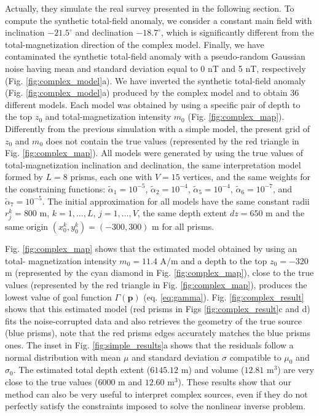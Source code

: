Actually, they simulate the real survey presented in the following section. To compute the synthetic total-field anomaly, we consider a constant main field with inclination $ -21.5^\circ $ and declination $ -18.7^\circ $, which is significantly different from the total-magnetization direction of the complex model. Finally, we have
contaminated the synthetic total-field anomaly with a pseudo-random Gaussian noise having mean and standard deviation equal to 0 nT and 5 nT, respectively (Fig. \ref{fig:complex_model}a). We have inverted the synthetic total-field anomaly (Fig. \ref{fig:complex_model}a) produced by the complex model and to obtain 36 different models. Each model was obtained by using a specific pair of depth to the top $ z_0 $
and total-magnetization intensity $ m_0 $ (Fig. \ref{fig:complex_map}). Differently from the previous simulation with a simple model, the present grid of $ z_0 $ and $ m_0 $ does not contain the true values (represented by the red triangle in Fig. \ref{fig:complex_map}). All models were generated by using the true values of total-magnetization inclination and declination, the same interpretation model formed by $ L = 8 $ prisms, each one with $ V = 15 $ vertices, and the same weights for the constraining functions: $\tilde{\alpha}_1 = 10^{-5}$, $\tilde{\alpha}_2 = 10^{-4}$, $\tilde{\alpha}_5 = 10^{-4}$, $\tilde{\alpha}_6 = 10^{-7}$, and $\tilde{\alpha}_7 = 10^{-5}$. The initial approximation for all models have the same constant radii $ r^k_j = 800 $ m, $ k = 1, \dots, L $, $ j = 1, \dots, V $, the same depth extent $ dz = 650 $ m and the same origin $ (x^k_0, y^k_0) = (-300, 300) $ m for all prisms.

Fig. \ref{fig:complex_map} shows that the estimated model obtained by using an total- magnetization intensity $ m_0 = 11.4 $ A/m and a depth to the top $ z_0 = -320 $ m (represented by the cyan diamond in Fig. \ref{fig:complex_map}), close to the true values (represented by the red triangle in Fig. \ref{fig:complex_map}), produces the lowest value of goal function $ \Gamma(\mathbf{p}) $ (eq. \ref{eq:gamma}). Fig. \ref{fig:complex_result} shows that this estimated model (red prisms in Figs \ref{fig:complex_result}c and d) fits the noise-corrupted data and also retrieves the geometry of the true source (blue prisms), note that the red prisms edges accurately matches the blue prisms ones. The inset in Fig. \ref{fig:simple_results}a shows that the residuals follow a normal distribution with mean $ \mu $ and standard deviation $ \sigma $ compatible to $ \mu_0 $ and $ \sigma_0 $. The estimated total depth extent ($ 6145.12 $ m) and volume ($ 12.81 $ m$^3 $) are very close to the true values ($ 6000 $ m and $ 12.60 $ m$^3 $). These results show that our method can also be very useful to interpret complex sources, even if they do not perfectly satisfy the constraints imposed to solve the nonlinear inverse problem.